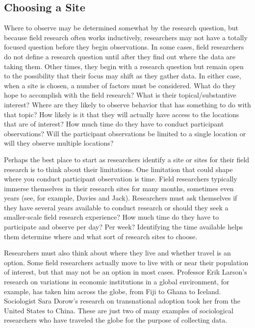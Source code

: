 \subsection{Choosing a Site}

Where to observe may be determined somewhat by the research question, but because field research often works inductively, researchers may not have a totally focused question before they begin observations. In some cases, field researchers do not define a research question until after they find out where the data are taking them. Other times, they begin with a research question but remain open to the possibility that their focus may shift as they gather data. In either case, when a site is chosen, a number of factors must be considered. What do they hope to accomplish with the field research? What is their topical/substantive interest? Where are they likely to observe behavior that has something to do with that topic? How likely is it that they will actually have access to the locations that are of interest? How much time do they have to conduct participant observations? Will the participant observations be limited to a single location or will they observe multiple locations?

Perhaps the best place to start as researchers identify a site or sites for their field research is to think about their limitations. One limitation that could shape where you conduct participant observation is time. Field researchers typically immerse themselves in their research sites for many months, sometimes even years (see, for example, Davies\cite{davies2010corporate} and Jack\cite{jack2010entrepreneurial}). Researchers must ask themselves if they have several years available to conduct research or should they seek a smaller-scale field research experience? How much time do they have to participate and observe per day? Per week? Identifying the time available helps them determine where and what sort of research sites to choose.

Researchers must also think about where they live and whether travel is an option. Some field researchers actually move to live with or near their population of interest, but that may not be an option in most cases. Professor Erik Larson’s research on variations in economic institutions in a global environment, for example, has taken him across the globe, from Fiji to Ghana to Iceland\cite{larson2010time}. Sociologist Sara Dorow's research on transnational adoption took her from the United States to China\cite{dorow2006racialized}. These are just two of many examples of sociological researchers who have traveled the globe for the purpose of collecting data. 

